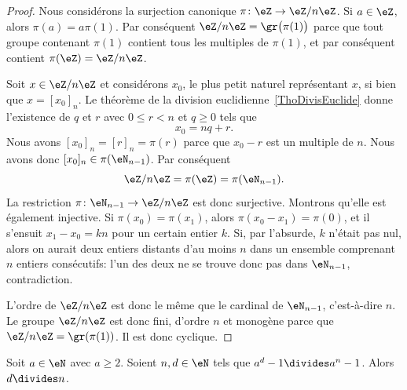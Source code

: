 \begin{proof}
    Nous considérons la surjection canonique \( \pi\colon \eZ\to \eZ/n\eZ\). Si \( a\in\eZ\), alors \( \pi(a)=a\pi(1)\). Par conséquent \( \eZ/n\eZ=\gr\bigl( \pi(1) \bigr)\) parce que tout groupe contenant \( \pi(1)\) contient tous les multiples de \( \pi(1)\), et par conséquent contient \( \pi(\eZ)=\eZ/n\eZ\).

    Soit \( x\in\eZ/n\eZ\) et considérons \( x_0\), le plus petit naturel représentant \( x\), si bien que \( x=[x_0]_n\). Le théorème de la division euclidienne~\ref{ThoDivisEuclide} donne l'existence de \( q\) et \( r\) avec \( 0\leq r<n\) et \( q\geq 0\) tels que
    \begin{equation}
        x_0=nq+r.
    \end{equation}
    Nous avons \( [x_0]_n=[r]_n=\pi(r)\) parce que \( x_0-r\) est un multiple de \( n\). Nous avons donc \( [x_0]_n\in\pi(\eN_{n-1})\). Par conséquent
    \begin{equation}
        \eZ/n\eZ=\pi(\eZ)=\pi(\eN_{n-1}).
    \end{equation}
    La restriction \( \pi\colon \eN_{n-1}\to \eZ/n\eZ\) est donc surjective. Montrons qu'elle est également injective. Si \( \pi(x_0)=\pi(x_1)\), alors \( \pi(x_0 - x_1) =\pi(0)\), et il s'ensuit \( x_1- x_0 = kn\) pour un certain entier \(k \). Si, par l'absurde, \( k \) n'était pas nul, alors on aurait deux entiers distants d'au moins \( n \) dans un ensemble comprenant \( n \) entiers consécutifs: l'un des deux ne se trouve donc pas dans \( \eN_{n-1} \), contradiction.

    L'ordre de \( \eZ/n\eZ\) est donc le même que le cardinal de \( \eN_{n-1}\), c'est-à-dire \( n\). Le groupe \( \eZ/n\eZ\) est donc fini, d'ordre \( n\) et monogène parce que \( \eZ/n\eZ=\gr(\pi(1))\). Il est donc cyclique.
\end{proof}


\begin{lemma}
    Soit \( a\in \eN\) avec \( a\geq 2\). Soient \( n,d\in \eN\) tels que \( a^d-1\divides a^n-1\). Alors \( d\divides n\).
\end{lemma}

